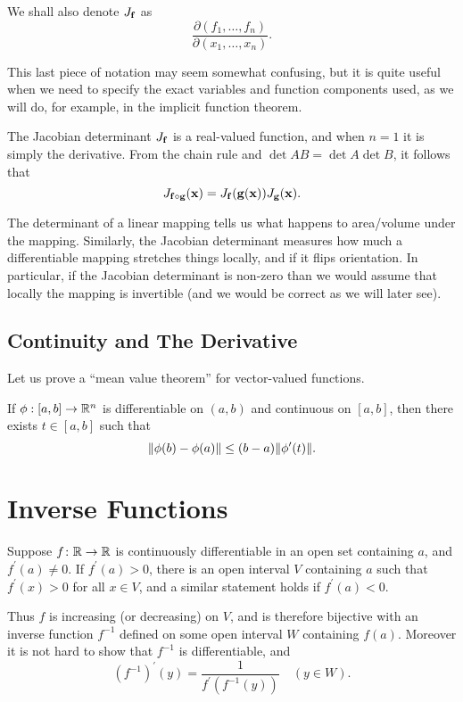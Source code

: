 We shall also denote $J_{\vb{f}}$ as
\[\frac{\partial(f_1,\dots,f_n)}{\partial(x_1,\dots,x_n)}.\]

This last piece of notation may seem somewhat confusing, but it is quite useful when we need to specify the exact variables and function components used, as we will do, for example, in the implicit function theorem.

The Jacobian determinant $J_{\vb{f}}$ is a real-valued function, and when $n=1$ it is simply the derivative. From the chain rule and $\det AB=\det A\det B$, it follows that
\[J_{\vb{f}\circ\vb{g}}(\vb{x})=J_{\vb{f}}(\vb{g}(\vb{x}))J_{\vb{g}}(\vb{x}).\]

The determinant of a linear mapping tells us what happens to area/volume under the mapping. Similarly, the Jacobian determinant measures how much a differentiable mapping stretches things locally, and if it flips orientation. In particular, if the Jacobian determinant is non-zero than we would assume that locally the mapping is invertible (and we would be correct as we will later see).

\subsection{Continuity and The Derivative}
Let us prove a ``mean value theorem'' for vector-valued functions.

\begin{theorem}
If $\phi:[a,b]\to\mathbb R^n$ is differentiable on $(a,b)$ and continuous on $[a,b]$, then there exists $t\in[a,b]$ such that
\begin{equation}
\norm{\phi(b)-\phi(a)}\le(b-a)\norm{\phi^\prime(t)}.
\end{equation}
\end{theorem}
\pagebreak

\section{Inverse Functions}
Suppose $f\colon\mathbb R\to\mathbb R$ is continuously differentiable in an open set containing $a$, and $f^\prime(a)\neq0$. If $f^\prime(a)>0$, there is an open interval $V$ containing $a$ such that $f^\prime(x)>0$ for all $x\in V$, and a similar statement holds if $f^\prime(a)<0$. 

Thus $f$ is increasing (or decreasing) on $V$, and is therefore bijective with an inverse function $f^{-1}$ defined on some open interval $W$ containing $f(a)$. 
Moreover it is not hard to show that $f^{-1}$ is differentiable, and 
\[(f^{-1})^\prime(y)=\frac{1}{f^\prime(f^{-1}(y))}\quad(y\in W).\]


